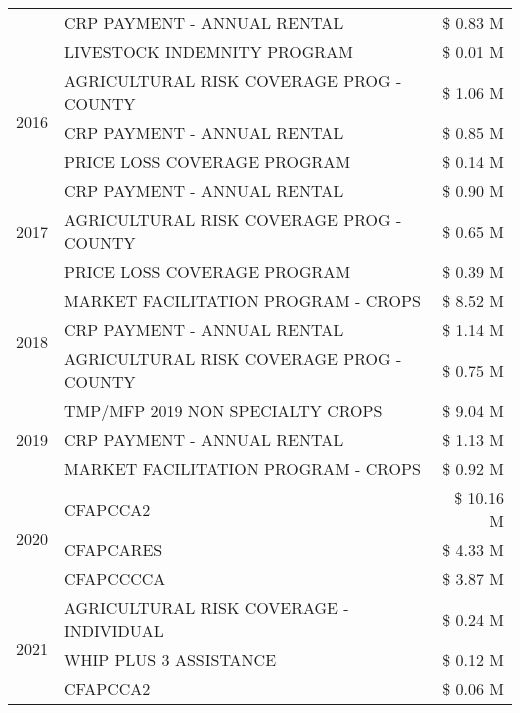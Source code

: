 \begin{tabular}{llr}
 & CRP PAYMENT - ANNUAL RENTAL & \$ 0.83 M \\
 & LIVESTOCK INDEMNITY PROGRAM & \$ 0.01 M \\
\cline{1-3}
\multirow[t]{3}{*}{2016} & AGRICULTURAL RISK COVERAGE PROG - COUNTY & \$ 1.06 M \\
 & CRP PAYMENT - ANNUAL RENTAL & \$ 0.85 M \\
 & PRICE LOSS COVERAGE PROGRAM & \$ 0.14 M \\
\cline{1-3}
\multirow[t]{3}{*}{2017} & CRP PAYMENT - ANNUAL RENTAL & \$ 0.90 M \\
 & AGRICULTURAL RISK COVERAGE PROG - COUNTY & \$ 0.65 M \\
 & PRICE LOSS COVERAGE PROGRAM & \$ 0.39 M \\
\cline{1-3}
\multirow[t]{3}{*}{2018} & MARKET FACILITATION PROGRAM - CROPS & \$ 8.52 M \\
 & CRP PAYMENT - ANNUAL RENTAL & \$ 1.14 M \\
 & AGRICULTURAL RISK COVERAGE PROG - COUNTY & \$ 0.75 M \\
\cline{1-3}
\multirow[t]{3}{*}{2019} & TMP/MFP 2019 NON SPECIALTY CROPS & \$ 9.04 M \\
 & CRP PAYMENT - ANNUAL RENTAL & \$ 1.13 M \\
 & MARKET FACILITATION PROGRAM - CROPS & \$ 0.92 M \\
\cline{1-3}
\multirow[t]{3}{*}{2020} & CFAPCCA2 & \$ 10.16 M \\
 & CFAPCARES & \$ 4.33 M \\
 & CFAPCCCCA & \$ 3.87 M \\
\cline{1-3}
\multirow[t]{3}{*}{2021} & AGRICULTURAL RISK COVERAGE - INDIVIDUAL & \$ 0.24 M \\
 & WHIP PLUS 3 ASSISTANCE & \$ 0.12 M \\
 & CFAPCCA2 & \$ 0.06 M \\
\cline{1-3}
\bottomrule
\end{tabular}
